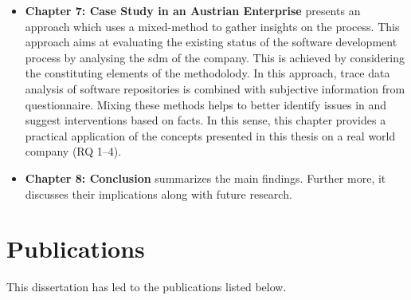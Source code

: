 \begin{itemize}
	\item \textbf{Chapter 7: Case Study in an Austrian Enterprise} presents an approach which uses a mixed-method to gather insights on the process. This approach aims at evaluating the existing status of the software development process by analysing the \gls{sdm} of the company. This is achieved by considering the constituting elements of the methodolody. In this approach, trace data analysis of software repositories is combined with subjective information from questionnaire. Mixing these methods helps to better identify issues in and suggest interventions based on facts. In this sense, this chapter provides a practical application of the concepts presented in this thesis on a real world company (RQ 1--4).
	
	\item \textbf{Chapter 8: Conclusion} summarizes the main findings. Further more, it discusses their implications along with future research. 
	 	
\end{itemize}


\section{Publications}
\label{sec:intro-related-publications}

This dissertation has led to the publications listed below.\\

